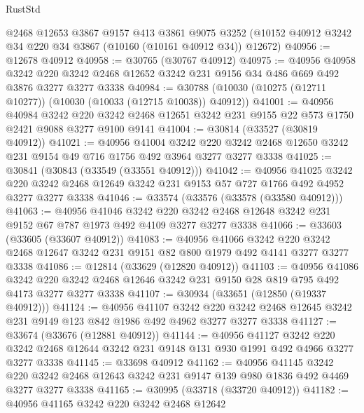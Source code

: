 \begin{lexlean}{RustStd}
\begin{coremodule}
    @2468
    @12653
    @3867
    @9157
    @413
    @3861
    @9075
    @3252
    (@10152 @40912 @3242 @34 @220 @34 @3867 (@10160 (@10161 @40912 @34)) @12672)
@40956 := @12678 @40912
@40958 := @30765 (@30767 @40912)
@40975 := @40956
    @40958
    @3242
    @220
    @3242
    @2468
    @12652
    @3242
    @231
    @9156
    @34
    @486
    @669
    @492
    @3876
    @3277
    @3277
    @3338
@40984 := @30788 (@10030 (@10275 (@12711 @10277)) (@10030 (@10033 (@12715 @10038)) @40912))
@41001 := @40956
    @40984
    @3242
    @220
    @3242
    @2468
    @12651
    @3242
    @231
    @9155
    @22
    @573
    @1750
    @2421
    @9088
    @3277
    @9100
    @9141
@41004 := @30814 (@33527 (@30819 @40912))
@41021 := @40956
    @41004
    @3242
    @220
    @3242
    @2468
    @12650
    @3242
    @231
    @9154
    @49
    @716
    @1756
    @492
    @3964
    @3277
    @3277
    @3338
@41025 := @30841 (@30843 (@33549 (@33551 @40912)))
@41042 := @40956
    @41025
    @3242
    @220
    @3242
    @2468
    @12649
    @3242
    @231
    @9153
    @57
    @727
    @1766
    @492
    @4952
    @3277
    @3277
    @3338
@41046 := @33574 (@33576 (@33578 (@33580 @40912)))
@41063 := @40956
    @41046
    @3242
    @220
    @3242
    @2468
    @12648
    @3242
    @231
    @9152
    @67
    @787
    @1973
    @492
    @4109
    @3277
    @3277
    @3338
@41066 := @33603 (@33605 (@33607 @40912))
@41083 := @40956
    @41066
    @3242
    @220
    @3242
    @2468
    @12647
    @3242
    @231
    @9151
    @82
    @800
    @1979
    @492
    @4141
    @3277
    @3277
    @3338
@41086 := @12814 (@33629 (@12820 @40912))
@41103 := @40956
    @41086
    @3242
    @220
    @3242
    @2468
    @12646
    @3242
    @231
    @9150
    @28
    @819
    @795
    @492
    @4173
    @3277
    @3277
    @3338
@41107 := @30934 (@33651 (@12850 (@19337 @40912)))
@41124 := @40956
    @41107
    @3242
    @220
    @3242
    @2468
    @12645
    @3242
    @231
    @9149
    @123
    @842
    @1986
    @492
    @4962
    @3277
    @3277
    @3338
@41127 := @33674 (@33676 (@12881 @40912))
@41144 := @40956
    @41127
    @3242
    @220
    @3242
    @2468
    @12644
    @3242
    @231
    @9148
    @131
    @930
    @1991
    @492
    @4966
    @3277
    @3277
    @3338
@41145 := @33698 @40912
@41162 := @40956
    @41145
    @3242
    @220
    @3242
    @2468
    @12643
    @3242
    @231
    @9147
    @139
    @980
    @1836
    @492
    @4469
    @3277
    @3277
    @3338
@41165 := @30995 (@33718 (@33720 @40912))
@41182 := @40956
    @41165
    @3242
    @220
    @3242
    @2468
    @12642

\end{coremodule}
\end{lexlean}
